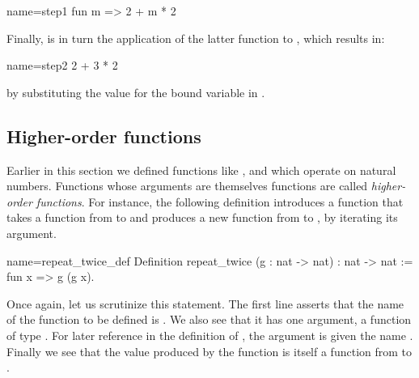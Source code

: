 \begin{coq}{name=step1}{}
fun m => 2 + m * 2
\end{coq}

Finally,  is in turn the application of the latter function to
, which results in:

\begin{coq}{name=step2}{}
2 + 3 * 2
\end{coq}

by substituting the value  for the bound variable  in
.




\subsection{Higher-order functions}

Earlier in this section we defined functions like ,  and 
which operate on natural numbers. Functions whose arguments are
themselves functions are called \emph{higher-order functions}.
For instance, the following definition introduces a function that
takes a function from  to  and produces a new function
from  to , by iterating its argument.

\begin{coq}{name=repeat_twice_def}{}
Definition repeat_twice (g : nat -> nat) : nat -> nat :=
  fun x => g (g x).
\end{coq}

Once again, let us scrutinize this \Coq{} statement. The first line
asserts that the name of the function to be defined is .
We also see that it has one argument, a function of
type .  For later reference in the definition of
, the argument is given the name .  Finally
we see that the value produced by the function 
is itself a function from  to .

